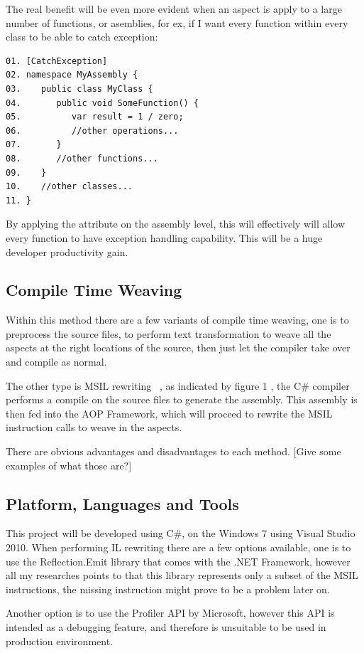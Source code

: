 The real benefit will be even more evident when an aspect is apply to a large number of functions, or asemblies, for ex, if I want every function within every class to be able to catch exception:

\begin{verbatim}
01. [CatchException]
02. namespace MyAssembly {
03.    public class MyClass {
04.       public void SomeFunction() {
05.          var result = 1 / zero;
06.          //other operations...
07.       }
08.       //other functions...
09.    }
10.    //other classes...
11. }
\end{verbatim}

By applying the attribute on the assembly level, this will effectively will allow every function to have exception handling capability. This will be a huge developer productivity gain.


\subsection{Compile Time Weaving}
Within this method there are a few variants of compile time weaving, one is to preprocess the source files, to perform text transformation to weave all the aspects at the right locations of the source, then just let the compiler take over and compile as normal.

The other type is MSIL rewriting ~\cite{rewrite_msil}, as indicated by figure 1 , the C\# compiler performs a compile on the source files to generate the assembly. This assembly is then fed into the AOP Framework, which will proceed to rewrite the MSIL instruction calls to weave in the aspects.

There are obvious advantages and disadvantages to each method. [Give some examples of what those are?]

\subsection{Platform, Languages and Tools}
This project will be developed using C\#, on the Windows 7 using Visual Studio 2010. When performing IL rewriting there are a few options available, one is to use the Reflection.Emit library that comes with the .NET Framework, however all my researches points to that this library represents only a subset of the MSIL instructions, the missing instruction might prove to be a problem later on.

Another option is to use the Profiler API by Microsoft, however this API is intended as a debugging feature, and therefore is unsuitable to be used in production environment.

